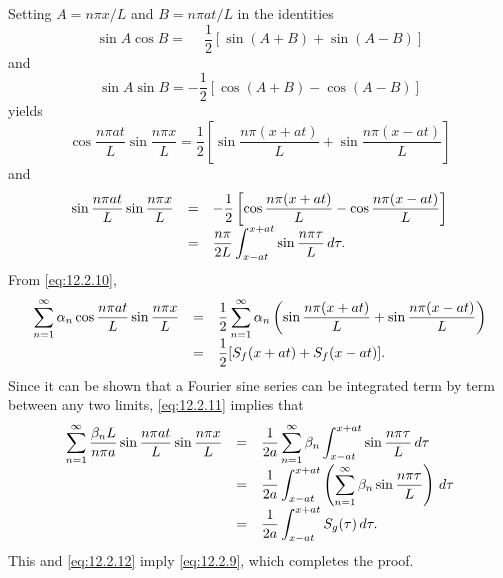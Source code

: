 \proof Setting $A=n\pi x/L$ and $B=n\pi at/L$ in the identities
\[
  \sin A\cos B=\phantom{-}{\frac{1}{2}}[\sin(A+B)+\sin(A-B)]
\]
and
\[
  \sin A\sin B=-\frac{1}{2}[\cos(A+B)-\cos(A-B)]
\]
yields
\begin{equation}
  \label{eq:12.2.10}\cos\frac{n\pi at}{L}\sin\frac{n\pi x}{L}=\frac{1}{2}\left[\sin\frac{n\pi(x+at)}{L}+\sin\frac{n\pi(x-at)}{L}\right]
\end{equation}
and
\begin{equation}
  \label{eq:12.2.11}
  \begin{array}{rcl}
    \displaystyle\sin\frac{n\pi at}{L}\sin\frac{n\pi x}{L} & = & -\displaystyle\frac{1}{2}\left[\cos\frac{n\pi(x+at)}{L}-\cos\frac{n\pi(x-at)}{L}\right] \\
                                                  & = & \displaystyle\frac{n\pi}{2L}\int_{x-at}^{x+at} \sin\frac{n\pi\tau}{L}\,d\tau.
  \end{array}
\end{equation}
From \eqref{eq:12.2.10},
\begin{equation}
  \label{eq:12.2.12}
  \begin{array}{rcl}
    \displaystyle\sum_{n=1}^{\infty}\alpha_{n}\cos\frac{n\pi at}{L}\sin\frac{n\pi x}{L} & = & \displaystyle\frac{1}{2}\sum_{n=1}^{\infty}\alpha_{n}\left(\sin\frac{n\pi(x+at)}{L} +\sin\frac{n\pi(x-at)}{L}\right) \\
                                                                               & = & \displaystyle\frac{1}{2}[S_{f}(x+at)+S_{f}(x-at)].
  \end{array}
\end{equation}
Since it can be shown that a Fourier sine series can be integrated term by term between any two
limits, \eqref{eq:12.2.11} implies that
\[
  \begin{array}{rcl}
    \displaystyle\sum_{n=1}^{\infty}\frac{\beta_{n}L}{n\pi a} \sin\frac{n\pi at}{L}\sin\frac{n\pi x}{L} & = & \displaystyle\frac{1}{2a}\sum_{n=1}^{\infty}\beta_{n}\int_{x-at}^{x+at} \sin\frac{n\pi\tau}{L}\,d\tau              \\
                                                                                               & = & \displaystyle\frac{1}{2a}\int_{x-at}^{x+at}\left(\sum_{n=1}^{\infty}\beta_{n} \sin\frac{n\pi\tau}{L}\right)\,d\tau \\
                                                                                               & = & \displaystyle\frac{1}{2a}\int_{x-at}^{x+at}S_{g}(\tau)\,d\tau.
  \end{array}
\]
This and \eqref{eq:12.2.12} imply \eqref{eq:12.2.9}, which completes the proof.

